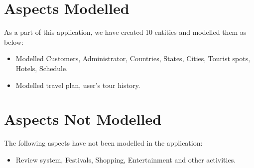 \documentclass[a4paper,11pt]{article}
\begin{document}
\section{Aspects Modelled}
As a part of this application, we have created 10 entities and modelled them as below:
\begin{itemize}
\item Modelled Customers, Administrator, Countries, States, Cities, Tourist spots, Hotels, Schedule.
\item Modelled travel plan, user's tour history. 
\end{itemize}

\section{Aspects Not Modelled}
The following aspects have not been modelled in the application:
\begin{itemize}
\item Review system, Festivals, Shopping, Entertainment and other activities.
\end{itemize}
\end{document}
